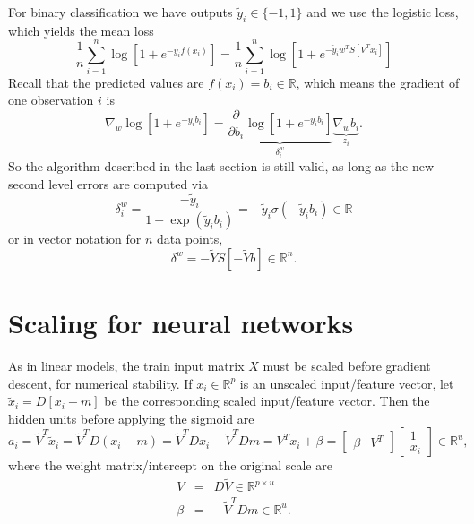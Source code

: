 \documentclass{article}
\begin{document}
For binary classification we have outputs $\tilde y_i \in \{-1, 1\}$
and we use the logistic loss, which yields the mean loss
\begin{equation}
  \label{eq:mean_NN_binary_loss}
  \frac 1 n \sum_{i=1}^n \log[ 1+ e^{ -\tilde y_i f(x_i) } ] =
  \frac 1 n \sum_{i=1}^n \log[ 1+ e^{ -\tilde y_i w^T S[V^T x_i] } ] 
\end{equation}
Recall that the predicted values are $f(x_i) = b_i\in\mathbb R$, which means the gradient of one observation $i$ is
\begin{equation}
  \label{eq:grad_w_binary}
  \nabla_w \log[ 1+ e^{ -\tilde y_i b_i } ] =
\underbrace{
  \frac{\partial}{\partial b_i} \log[ 1+ e^{ -\tilde y_i b_i } ]
}_{\delta_i^w}
\underbrace{
  \nabla_w b_i
}_{z_i}.
\end{equation}
So the algorithm described in the last section is still valid, as long
as the new second level errors are computed via
\begin{equation}
  \label{eq:delta_i_w_binary}
  \delta_i^w = \frac{-\tilde y_i}{1+\exp(\tilde y_i b_i)} = -\tilde y_i\sigma(-\tilde y_i b_i)\in\mathbb R
\end{equation}
or in vector notation for $n$ data points,
\begin{equation}
  \label{eq:delta_w_binary}
  \delta^w = -\tilde Y S[ -\tilde Y b ]\in \mathbb R^n.
\end{equation}

\section{Scaling for neural networks}

As in linear models, the train input matrix $X$ must be scaled before
gradient descent, for numerical stability. If $x_i\in\mathbb R^p$ is
an unscaled input/feature vector, let $\tilde x_i = D[x_i - m]$ be the
corresponding scaled input/feature vector. Then the hidden units
before applying the sigmoid are
\begin{equation}
  \label{eq:nn_scaled_prediction}
  a_i = \tilde V^T \tilde x_i = 
  \tilde V^T D (x_i - m) = \tilde V^T D x_i - \tilde V^T D m = 
  V^T x_i + \beta = 
  \left[\begin{array}{cc}
          \beta & V^T
  \end{array}\right]
  \left[\begin{array}{c}
          1 \\ x_i
  \end{array}\right]
\in\mathbb R^u,
\end{equation}
where the weight matrix/intercept on the original scale are
\begin{eqnarray*}
  V &=& D \tilde V\in \mathbb R^{p \times u}\\
  \beta &=& - \tilde V^T D m\in \mathbb R^u.
\end{eqnarray*}



\end{document}
